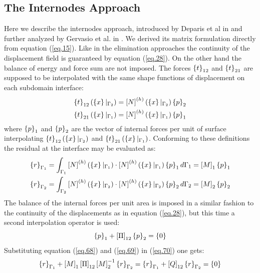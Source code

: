 \subsection{The Internodes Approach}\label{ssec35}
Here we describe the internodes approach, introduced by Deparis et al in \cite{deparis2016internodes} and further analyzed by Gervasio et al. in \cite{gervasio2016analysis}. We derived its matrix formulation directly from equation (\ref{eq.15}). Like in the elimination approaches the continuity of the displacement field is guaranteed by equation (\ref{eq.28}). On the other hand the balance of energy and force sum are not imposed. The forces $\left\lbrace{t}\right \rbrace_{12}$ and $\left\lbrace{t}\right \rbrace_{21}$ are supposed to be interpolated with the same shape functions of displacement  on each subdomain interface:
\begin{eqnarray}
\label{eq.66}
 \left\lbrace{t}\right \rbrace_{12}(\left\lbrace{x}\right \rbrace|_{\Gamma_2})=\left[{N}\right]^{(h)}(\left\lbrace{x}\right \rbrace|_{\Gamma_2}) \left\lbrace{p}\right \rbrace_{2}\\
 \label{eq.67}
 \left\lbrace{t}\right \rbrace_{21}(\left\lbrace{x}\right \rbrace|_{\Gamma_1})=\left[{N}\right]^{(h)}(\left\lbrace{x}\right \rbrace|_{\Gamma_1}) \left\lbrace{p}\right \rbrace_{1}
\end{eqnarray}
where $\left\lbrace{p}\right \rbrace_{1}$ and $\left\lbrace{p}\right \rbrace_{2}$ are the vector of internal forces per unit of surface interpolating $\left\lbrace{t}\right \rbrace_{12}(\left\lbrace{x}\right \rbrace|_{\Gamma_2})$ and $ \left\lbrace{t}\right \rbrace_{21}(\left\lbrace{x}\right \rbrace|_{\Gamma_1})$.
Conforming to these definitions the residual at the interface may be evaluated as:
\begin{eqnarray}
\label{eq.68}
 \left\lbrace{r}\right \rbrace_{\Gamma_1}=\int_{\Gamma_1}\left[{N}\right]^{(h)}(\left\lbrace{x}\right \rbrace|_{\Gamma_1})\cdot\left[{N}\right]^{(h)}(\left\lbrace{x}\right \rbrace|_{\Gamma_1}) \left\lbrace{p}\right \rbrace_{1}d\Gamma_1=\left[{M}\right]_1\left\lbrace{p}\right \rbrace_{1}\\
 \label{eq.69}
\left\lbrace{r}\right \rbrace_{\Gamma_2}=\int_{\Gamma_2}\left[{N}\right]^{(h)}(\left\lbrace{x}\right \rbrace|_{\Gamma_2})\cdot\left[{N}\right]^{(h)}(\left\lbrace{x}\right \rbrace|_{\Gamma_2}) \left\lbrace{p}\right \rbrace_{2}d\Gamma_2=\left[{M}\right]_2\left\lbrace{p}\right \rbrace_{2}
\end{eqnarray}
The balance of the internal forces per unit area is imposed in a similar fashion to the continuity of the displacements as in equation (\ref{eq.28}), but this time a second interpolation operator is used:
\begin{equation}
\label{eq.70}
\left\lbrace{p}\right \rbrace_{1}+\left[{\Pi}\right]_{12}\left\lbrace{p}\right \rbrace_{2}=\left\lbrace{0}\right \rbrace
\end{equation}
Substituting equation (\ref{eq.68}) and (\ref{eq.69}) in (\ref{eq.70}) one gets:
\begin{equation}
\label{eq.71}
\left\lbrace{r}\right \rbrace_{\Gamma_1}+\left[{M}\right]_1\left[{\Pi}\right]_{12}\left[{M}\right]_2^{-1}\left\lbrace{r}\right \rbrace_{\Gamma_2}=\left\lbrace{r}\right \rbrace_{\Gamma_1}+\left[{Q}\right]_{12}\left\lbrace{r}\right \rbrace_{\Gamma_2}=\left\lbrace{0}\right \rbrace
\end{equation}
